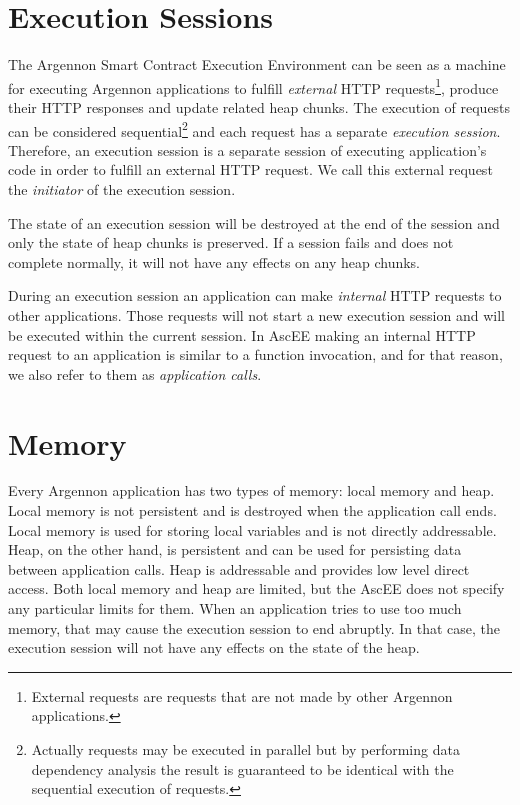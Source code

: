 \section{Execution Sessions}\label{sec:sessions}

The Argennon Smart Contract Execution Environment can be seen as a machine for executing Argennon applications to
fulfill \emph{external} HTTP requests\footnote{External requests are requests that are not made by other Argennon
applications.}, produce their HTTP responses and update related heap chunks. The execution of requests can be
considered sequential\footnote{Actually requests may be executed in parallel but by performing data dependency analysis
the result is guaranteed to be identical with the sequential execution of requests.} and each request has a separate
\emph{execution session}. Therefore, an execution session is a separate session of executing application's code in
order to fulfill an external HTTP request. We call this external request the \emph{initiator} of the execution session.


The state of an execution session will be
destroyed at the end of the session and only the state of heap chunks is preserved. If a session fails and does not
complete normally, it will not have any effects on any heap chunks.

During an execution session an application can make \emph{internal} HTTP requests to other applications. Those
requests will not start a new execution session and will be executed within the current session. In AscEE making an
internal HTTP request to an application is similar to a function invocation, and for that reason, we also refer to
them as \emph{application calls}.


\section{Memory}\label{mem}

Every Argennon application has two types of memory: local memory and heap. Local memory is not persistent and is
destroyed when the application call ends. Local memory is used for storing local variables and is not directly
addressable. Heap, on the other hand, is persistent and can be used for persisting data between application calls.
Heap is addressable and provides low level direct access. Both local memory and heap are limited, but the
AscEE does not specify any particular limits for them. When an application tries to use too much memory, that may
cause the execution session to end abruptly. In that case, the execution session will not have any effects on the
state of the heap.

